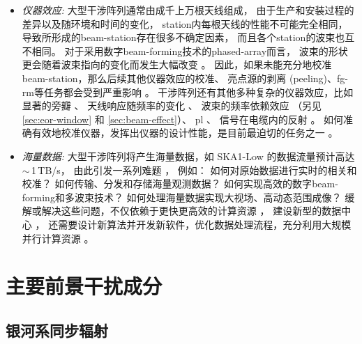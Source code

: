 \begin{itemize}
\item
\emph{仪器效应:}
大型干涉阵列通常由成千上万根天线组成，
由于生产和安装过程的差异以及随环境和时间的变化，
\ac{station}内每根天线的性能不可能完全相同，
导致所形成的\ac{beam-station}存在很多不确定因素，
而且各个\ac{station}的波束也互不相同。
对于采用数字\ac{beam-forming}技术的\ac{phased-array}而言，
波束的形状更会随着波束指向的变化而发生大幅改变
\cite{smirnov2011iii,vanWeeren2016,jagannathan2017}。
因此，如果未能充分地校准\ac{beam-station}，那么后续其他仪器效应的校准、
亮点源的剥离 (peeling)、\ac{fg-rm}等任务都会受到严重影响
\cite{noordam2004,neben2016}。
干涉阵列还有其他多种复杂的仪器效应，比如
显著的旁瓣 \cite{thyagarajan2015,mort2017}、
天线响应随频率的变化 \cite{bernardi2015,trott2017}、
波束的频率依赖效应 \cite{liu2009ps,datta2010,morales2012}
（另见 \autoref{sec:eor-window} 和 \autoref{sec:beam-effect}）、
\ac{pl} \cite{asad2015,asad2016,asad2018,lenc2017}、
信号在电缆内的反射 \cite{beardsley2016}。
如何准确有效地校准仪器，发挥出仪器的设计性能，是目前最迫切的任务之一
\cite{noordam2004,mitchell2008,wijnholds2010,barry2016,dillon2016}。

\item
\emph{海量数据:}
大型干涉阵列将产生海量数据，如 SKA1-Low 的数据流量预计高达 $\sim$\,1\,TB/s，
由此引发一系列难题 \cite{norris2011,dolensky2016,chrysostomou2018}，
例如：
如何对原始数据进行实时的相关和校准？
如何传输、分发和存储海量观测数据？
如何实现高效的数字\ac{beam-forming}和多波束技术？
如何处理海量数据实现大视场、高动态范围成像？
缓解或解决这些问题，不仅依赖于更快更高效的计算资源 \cite{magro2014,vermij2017}，
建设新型的数据中心 \cite{chrysostomou2018}，
还需要设计新算法并开发新软件，优化数据处理流程，充分利用大规模并行计算资源
\cite{morales2009,bonaldi2018,farnes2018,gunst2018}。

\end{itemize}


\section{主要前景干扰成分}
\label{sec:fg-intro}

\subsection{银河系同步辐射}


